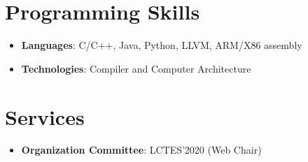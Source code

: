 \documentclass[letterpaper,11pt]{article}
\newcommand{\resumeSubHeadingListStart}{\begin{itemize}[leftmargin=*]}
\newcommand{\resumeSubHeadingListEnd}{\end{itemize}}
\begin{document}
%
\section{Programming Skills}
 \resumeSubHeadingListStart
   \item{
     \textbf{Languages}{: C/C++, Java, Python, LLVM, ARM/X86 assembly}
   }
   \item{
     \textbf{Technologies}{: Compiler and Computer Architecture}
   }
 \resumeSubHeadingListEnd

\section{Services}
  \resumeSubHeadingListStart
    \item{
      \textbf{Organization Committee}{: LCTES'2020 (Web Chair)}
    }
  \resumeSubHeadingListEnd
\end{document}
